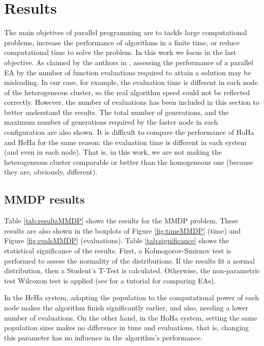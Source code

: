 \documentclass[final,1p,times]{elsarticle}
\begin{document}

\section{Results}
\label{sec:results}

The main objetives of parallel programming are to tackle large computational problems, increase the performance of algorithms in a finite time, or reduce computational time to solve the problem. In this work we focus in the last objective.
As claimed by the authors in \cite{EVALUATIONPARALLEL}, assessing the performance of a parallel EA by the number of function evaluations required to attain a solution may be misleading. In our case, for example, the evaluation time is different in each node of the heterogeneous cluster, so the real algorithm speed could not be reflected correctly. However, the number of evaluations has been included in this section to better understand the results. The total number of generations, and the maximum number of generations required by the faster node in each configuration are also shown. It is difficult to compare the performance of HoHa and HeHa for the same reason: the evaluation time is different in each system (and even in each node). That is, in this work, we are not making the heterogeneous cluster comparable or better than the homogeneous one (because they are, obviously, different).

\subsection{MMDP results}

Table \ref{tab:resultsMMDP} shows the results for the MMDP problem. These results are also shown in the boxplots of Figure \ref{fig:timeMMDP} (time) and Figure \ref{fig:evalsMMDP} (evaluations). Table \ref{tab:significance} shows the statistical significance of the results. First, a Kolmogorov-Smirnov test is performed to assess the normality of the distributions. If the results fit a normal distribution, then a Student's T-Test is calculated. Otherwise, the non-parametric test Wilcoxon test is applied (see \cite{TUTORIAL} for a tutorial for comparing EAs).

 In the HeHa system, adapting the population to the computational
 power of each node makes the algorithm finish significantly earlier,
 and also, needing a lower number of evaluations. On the other hand, in the HoHa system,
 setting the same population sizes makes no difference in time and
 evaluations, that is, changing this parameter has no influence in the
 algorithm's performance.  
\end{document}
